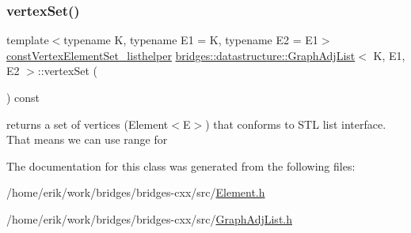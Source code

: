 \subsubsection{\texorpdfstring{vertex\+Set()}{vertexSet()}\hspace{0.1cm}{\footnotesize\ttfamily [2/2]}}
{\footnotesize\ttfamily template$<$typename K, typename E1 = K, typename E2 = E1$>$ \\
\hyperlink{classbridges_1_1datastructure_1_1_graph_adj_list_1_1const_vertex_element_set__listhelper}{const\+Vertex\+Element\+Set\+\_\+listhelper} \hyperlink{classbridges_1_1datastructure_1_1_graph_adj_list}{bridges\+::datastructure\+::\+Graph\+Adj\+List}$<$ K, E1, E2 $>$\+::vertex\+Set (\begin{DoxyParamCaption}{ }\end{DoxyParamCaption}) const\hspace{0.3cm}{\ttfamily [inline]}}



returns a set of vertices (Element$<$\+E$>$) that conforms to S\+TL list interface. That means we can use range for 



The documentation for this class was generated from the following files\+:\begin{DoxyCompactItemize}
\item 
/home/erik/work/bridges/bridges-\/cxx/src/\hyperlink{_element_8h}{Element.\+h}\item 
/home/erik/work/bridges/bridges-\/cxx/src/\hyperlink{_graph_adj_list_8h}{Graph\+Adj\+List.\+h}\end{DoxyCompactItemize}
